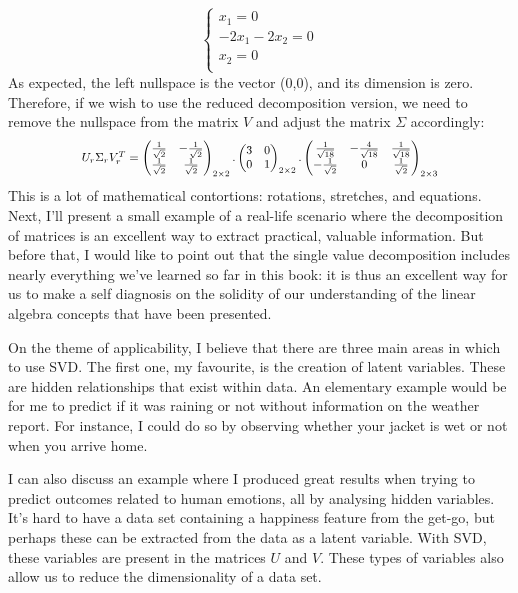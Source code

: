 \documentclass[600paper, 11pt,twoside,openany]{kdp}
\begin{document}
\[
    \begin{cases}
      x_1 = 0\\
      -2x_1 - 2x_2 = 0\\
      x_2 = 0\\
    \end{cases}
\]
\indent As expected, the left nullspace is the vector (0,0), and its dimension is zero. Therefore, if we wish to use the reduced decomposition version, we need to  remove the nullspace from the matrix $V$ and adjust the matrix $\Sigma$ accordingly:
\[\scalebox{.85}{$U_r \Sigma_r V^T_r = \begin{pmatrix}
\frac{1}{\sqrt{2}} & -\frac{1}{\sqrt{2}} \\
\frac{1}{\sqrt{2}} & \frac{1}{\sqrt{2}}
\end{pmatrix}_{2 \times 2}.\begin{pmatrix}
3 & 0 \\
0 & 1  \\
\end{pmatrix}_{2\times 2}.
\begin{pmatrix}
\frac{1}{\sqrt{18}} &-\frac{4}{\sqrt{18}} & \frac{1}{\sqrt{18}}\\
 -\frac{1}{\sqrt{2}}   & 0 & \frac{1}{\sqrt{2}} \\
\end{pmatrix}_{2 \times 3}$}
\]
\indent This is a lot of mathematical contortions: rotations, stretches, and equations. Next, I’ll present a small example of a real-life scenario where the decomposition of matrices is an excellent way to extract practical, valuable information. But before that, I would like to point out that the single value decomposition includes nearly everything we’ve learned so far in this book: it is thus an excellent way for us to make a self diagnosis on the solidity of our understanding of the linear algebra concepts that have been presented. 
\par 
\vspace{-3pt}
\indent On the theme of applicability, I believe that there are three main areas in which to use SVD. The first one, my favourite, is the creation of latent variables. These are hidden relationships that exist within data. An elementary example would be for me to predict if it was raining or not without information on the weather report. For instance, I could do so by observing whether your jacket is wet or not when you arrive home. 
\par 
\vspace{-3pt}
\indent I can also discuss an example where I produced great results when trying to predict outcomes related to human emotions, all by analysing hidden variables. It’s hard to have a data set containing a happiness feature from the get-go, but perhaps these can be extracted from the data as a latent variable. With SVD, these variables are present in the matrices $U$ and $V$. These types of variables also allow us to reduce the dimensionality of a data set.
\end{document}
